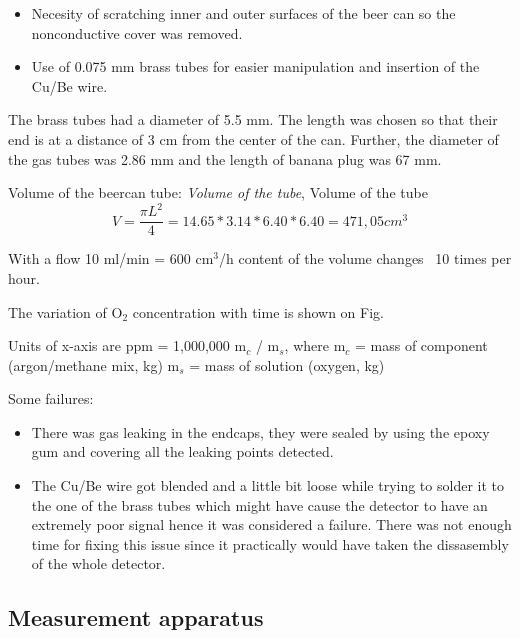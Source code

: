 \begin{itemize}
  \item Necesity of scratching inner and outer surfaces of the beer can so the nonconductive cover was removed.	
  \item Use of 0.075 mm brass tubes for easier manipulation and insertion of the Cu/Be wire.
\end{itemize}
  

The brass tubes had a diameter of 5.5 mm. The length was chosen so that their end is at a
distance of 3 cm from the center of the can. Further, the diameter of the gas tubes was 2.86 mm and
the length of banana plug was 67 mm.

Volume of the beercan tube:
\emph{Volume of the tube}, Volume of the tube
\begin{equation}
  \label{eq:tube_volume}
  V=\frac{\pi L^2}{4} =14.65*3.14*6.40*6.40=471,05 cm^3
\end{equation}

With a flow 10 ml/min = 600 cm$^3$/h content of the volume changes ~10 times per hour.

The variation of O$_{2}$ concentration with time is shown on Fig.

Units of x-axis are ppm = 1,000,000 m$_{c}$ / m$_{s}$, where 
m$_{c}$ = mass of component (argon/methane mix, kg)
m$_{s}$ = mass of solution (oxygen, kg)


Some failures:
\begin{itemize}
  \item There was gas leaking in the endcaps, they were sealed by using the epoxy gum and covering all the leaking points detected. 
  \item The Cu/Be wire got blended and a little bit loose while trying to solder it to the one of the brass tubes which might have cause the detector to have an extremely poor signal hence it was considered a failure. There was not enough time for fixing this issue since it practically would have taken the dissasembly of the whole detector.
\end{itemize}    


\subsection{Measurement apparatus}
\label{sec:meas-appar}






